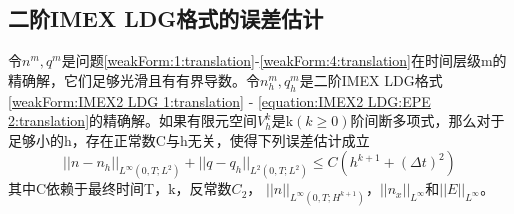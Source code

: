 \subsection{二阶IMEX LDG格式的误差估计}
\begin{theorem}
    令$n^m,q^m$是问题\eqref{weakForm:1:translation}-\ref{weakForm:4:translation}在时间层级m的精确解，它们足够光滑且有有界导数。令$n_h^m,q_h^m$是二阶IMEX LDG格式\eqref{weakForm:IMEX2 LDG 1:translation} - \ref{equation:IMEX2 LDG:EPE 2:translation}的精确解。如果有限元空间$V_h^k$是k$(k\geq  0)$阶间断多项式，那么对于足够小的h，存在正常数C与h无关，使得下列误差估计成立
    \begin{equation}
        ||n-n_h||_{L^{\infty}(0,T;L^2)} + ||q - q_h||_{L^2(0,T;L^2)} \leq C(h^{k+1} + (\Delta t)^2)
    \end{equation}
    其中C依赖于最终时间T，k，反常数$C_2$， $||n||_{L^{\infty}(0,T;H^{k+1})}$，$||n_x||_{L^{\infty}}$和$||E||_{L^{\infty}}$。
\end{theorem}
